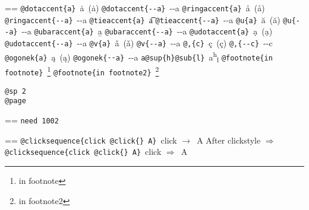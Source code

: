 \documentclass{book}
\makeatletter
\newenvironment{Texinfopreformatted}{%
  \par\GNUTobeylines\obeyspaces\frenchspacing\parskip=\z@\parindent=\z@}{}
{\catcode`\^^M=13 \gdef\GNUTobeylines{\catcode`\^^M=13 \def^^M{\null\par}}}
\newenvironment{Texinfoindented}{\begin{list}{}{}\item\relax}{\end{list}}
\renewcommand{\_}{\Texinfounderscore\discretionary{}{}{}}
\makeatother
\begin{document}
\begin{Texinfoindented}
\begin{Texinfopreformatted}
\texttt{@dotaccent\{a\}}\ \.{a}\ (ȧ)
\texttt{@dotaccent\{{-}{-}a\}}\ \.{{-}{-}a}
\texttt{@ringaccent\{a\}}\ \r{a}\ (å)
\texttt{@ringaccent\{{-}{-}a\}}\ \r{{-}{-}a}
\texttt{@tieaccent\{a\}}\ \t{a}
\texttt{@tieaccent\{{-}{-}a\}}\ \t{{-}{-}a}
\texttt{@u\{a\}}\ \u{a}\ (ă)
\texttt{@u\{{-}{-}a\}}\ \u{{-}{-}a}
\texttt{@ubaraccent\{a\}}\ \b{a}
\texttt{@ubaraccent\{{-}{-}a\}}\ \b{{-}{-}a}
\texttt{@udotaccent\{a\}}\ \d{a}\ (ạ)
\texttt{@udotaccent\{{-}{-}a\}}\ \d{{-}{-}a}
\texttt{@v\{a\}}\ \v{a}\ (ǎ)
\texttt{@v\{{-}{-}a\}}\ \v{{-}{-}a}
\texttt{@,\{c\}}\ \c{c}\ (ç)
\texttt{@,\{{-}{-}c\}}\ \c{{-}{-}c}
\texttt{@ogonek\{a\}}\ \k{a}\ (ą)
\texttt{@ogonek\{{-}{-}a\}}\ \k{{-}{-}a}
\texttt{a@sup\{h\}@sub\{l\}}\ a\textsuperscript{h}\textsubscript{l}
\texttt{@footnote\{in footnote\}}\ \footnote{in footnote}
\texttt{@footnote\{in footnote2\}}\ \footnote{in footnote2}

\texttt{@sp 2}\leavevmode{}\\
\baselineskip %
\texttt{@page}\leavevmode{}\\
\end{Texinfopreformatted}
\newpage{}%
\phantom{blabla}%
\begin{Texinfopreformatted}%
\ttfamily 
\texttt{need 1002}
\end{Texinfopreformatted}
\needspace{1.002pt}%
\begin{Texinfopreformatted}%
\ttfamily 
\texttt{@clicksequence\{click @click\{\}\ A\}}\ click $\rightarrow{}$\ A
After clickstyle $\Rightarrow{}$
\texttt{@clicksequence\{click @click\{\}\ A\}}\ click $\Rightarrow{}$\ A



\end{Texinfopreformatted}
\end{Texinfoindented}
\end{document}
